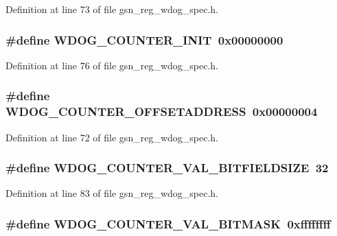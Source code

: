 Definition at line 73 of file gsn\_\-reg\_\-wdog\_\-spec.h.

\hypertarget{a00577_a7e22e9a0aef302720900dbf69b14fc76}{
\subsubsection[{WDOG\_\-COUNTER\_\-INIT}]{\setlength{\rightskip}{0pt plus 5cm}\#define WDOG\_\-COUNTER\_\-INIT~0x00000000}}
\label{a00577_a7e22e9a0aef302720900dbf69b14fc76}


Definition at line 76 of file gsn\_\-reg\_\-wdog\_\-spec.h.

\hypertarget{a00577_ae8fd51ae6061a4a38428e6ce2e91a8f0}{
\subsubsection[{WDOG\_\-COUNTER\_\-OFFSETADDRESS}]{\setlength{\rightskip}{0pt plus 5cm}\#define WDOG\_\-COUNTER\_\-OFFSETADDRESS~0x00000004}}
\label{a00577_ae8fd51ae6061a4a38428e6ce2e91a8f0}


Definition at line 72 of file gsn\_\-reg\_\-wdog\_\-spec.h.

\hypertarget{a00577_a1710d0675e6a6618377ac4115cfda648}{
\subsubsection[{WDOG\_\-COUNTER\_\-VAL\_\-BITFIELDSIZE}]{\setlength{\rightskip}{0pt plus 5cm}\#define WDOG\_\-COUNTER\_\-VAL\_\-BITFIELDSIZE~32}}
\label{a00577_a1710d0675e6a6618377ac4115cfda648}


Definition at line 83 of file gsn\_\-reg\_\-wdog\_\-spec.h.

\hypertarget{a00577_a3c7ef8c52e67506a942ae1faf8bb92e0}{
\subsubsection[{WDOG\_\-COUNTER\_\-VAL\_\-BITMASK}]{\setlength{\rightskip}{0pt plus 5cm}\#define WDOG\_\-COUNTER\_\-VAL\_\-BITMASK~0xffffffff}}
\label{a00577_a3c7ef8c52e67506a942ae1faf8bb92e0}


